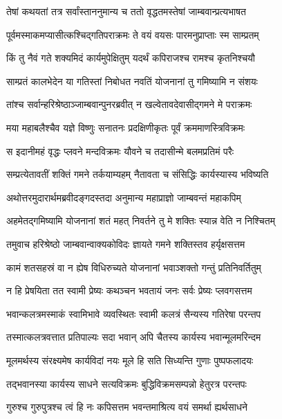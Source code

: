 \twolineshloka
{तेषां कथयतां तत्र सर्वांस्ताननुमान्य च}
{ततो वृद्धतमस्तेषां जाम्बवान्प्रत्यभाषत} %

\twolineshloka
{पूर्वमस्माकमप्यासीत्कश्चिद्गतिपराक्रमः}
{ते वयं वयसः पारमनुप्राप्ताः स्म साम्प्रतम्} %

\twolineshloka
{किं तु नैवं गते शक्यमिदं कार्यमुपेक्षितुम्}
{यदर्थं कपिराजश्च रामश्च कृतनिश्चयौ} %

\twolineshloka
{साम्प्रतं कालभेदेन या गतिस्तां निबोधत}
{नवतिं योजनानां तु गमिष्यामि न संशयः} %

\twolineshloka
{तांश्च सर्वान्हरिश्रेष्ठाञ्जाम्बवान्पुनरब्रवीत्}
{न खल्वेतावदेवासीद्गमने मे पराक्रमः} %

\twolineshloka
{मया महाबलैश्चैव यज्ञे विष्णुः सनातनः}
{प्रदक्षिणीकृतः पूर्वं क्रममाणस्त्रिविक्रमः} %

\twolineshloka
{स इदानीमहं वृद्धः प्लवने मन्दविक्रमः}
{यौवने च तदासीन्मे बलमप्रतिमं परैः} %

\twolineshloka
{सम्प्रत्येतावतीं शक्तिं गमने तर्कयाम्यहम्}
{नैतावता च संसिद्धिः कार्यस्यास्य भविष्यति} %

\twolineshloka
{अथोत्तरमुदारार्थमब्रवीदङ्गदस्तदा}
{अनुमान्य महाप्राज्ञो जाम्बवन्तं महाकपिम्} %

\twolineshloka
{अहमेतद्गमिष्यामि योजनानां शतं महत्}
{निवर्तने तु मे शक्तिः स्यान्न वेति न निश्चितम्} %

\twolineshloka
{तमुवाच हरिश्रेष्ठो जाम्बवान्वाक्यकोविदः}
{ज्ञायते गमने शक्तिस्तव हर्यृक्षसत्तम} %

\twolineshloka
{कामं शतसहस्रं वा न ह्येष विधिरुच्यते}
{योजनानां भवाञ्शक्तो गन्तुं प्रतिनिवर्तितुम्} %

\twolineshloka
{न हि प्रेषयिता तत स्वामी प्रेष्यः कथञ्चन}
{भवतायं जनः सर्वः प्रेष्यः प्लवगसत्तम} %

\twolineshloka
{भवान्कलत्रमस्माकं स्वामिभावे व्यवस्थितः}
{स्वामी कलत्रं सैन्यस्य गतिरेषा परन्तप} %

\twolineshloka
{तस्मात्कलत्रवत्तात प्रतिपाल्यः सदा भवान्}
{अपि चैतस्य कार्यस्य भवान्मूलमरिन्दम} %

\twolineshloka
{मूलमर्थस्य संरक्ष्यमेष कार्यविदां नयः}
{मूले हि सति सिध्यन्ति गुणाः पुष्पफलादयः} %

\twolineshloka
{तद्भवानस्या कार्यस्य साधने सत्यविक्रमः}
{बुद्धिविक्रमसम्पन्नो हेतुरत्र परन्तपः} %

\twolineshloka
{गुरुश्च गुरुपुत्रश्च त्वं हि नः कपिसत्तम}
{भवन्तमाश्रित्य वयं समर्था ह्यर्थसाधने} %

